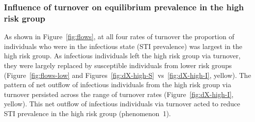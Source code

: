 \subsubsection{Influence of turnover on equilibrium prevalence in the high risk group}
\label{sss:res-prev-high}
As shown in Figure~\ref{fig:flows}, at all four rates of turnover
the proportion of individuals who were in the infectious state (STI prevalence)
was largest in the high risk group.
As infectious individuals left the high risk group via turnover,
they were largely replaced by susceptible individuals from lower risk groups
(Figure~\ref{fig:flows-low} and
Figures~\ref{fig:dX-high-S}~vs~\ref{fig:dX-high-I}, yellow).
The pattern of net outflow of infectious individuals
from the high risk group via turnover
persisted across the range of turnover rates
(Figure~\ref{fig:dX-high-I}, yellow).
This net outflow of infectious individuals via turnover
acted to reduce STI prevalence in the high risk group
(phenomenon~1).
